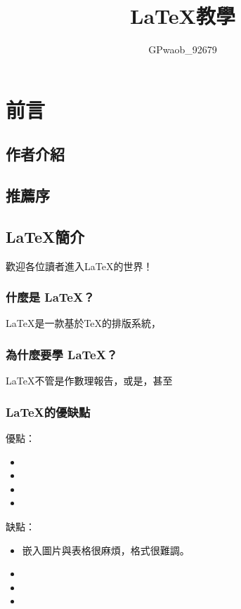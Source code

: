 \documentclass[14pt]{extreport}
\title{
	\fontsize{48pt}{\baselineskip}
	\LaTeX 教學}
\author{
	\fontspec{[Aller.ttc]}
	GPwaob\_92679}
\date{}
\begin{document}
	\maketitle
	\tableofcontents


	\part{前言}
		\chapter*{作者介紹}
		
		\chapter*{推薦序}
			
			
			
		
		
		
		
		
		\chapter{\LaTeX 簡介}
		歡迎各位讀者進入\LaTeX 的世界！
			\section{什麼是 \LaTeX ？}
				\LaTeX 是一款基於\TeX 的排版系統，
			\section{為什麼要學 \LaTeX ？}
			\LaTeX 不管是作數理報告，或是，甚至
			
			\section{\LaTeX 的優缺點}
			優點：
			\indent	\begin{itemize}
					\item 
					\item 
					\item 
					\item 
				\end{itemize}				
			缺點：
			\indent	\begin{itemize}
					\item 嵌入圖片與表格很麻煩，格式很難調。
					\item 
					\item 
					\item 		
				\end{itemize}
\end{document}
